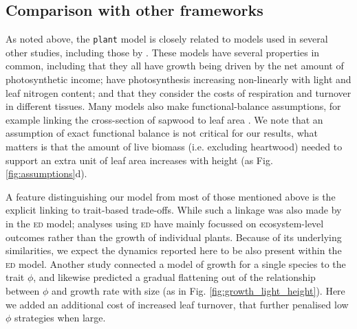 \documentclass[9pt,twocolumn,twoside,lineno]{pnas-new}
\newcommand{\plant}{\texttt{plant}}
\begin{document}
\subsection{Comparison with other frameworks}

As noted above, the {\plant} model is closely related to models used in several other studies, including those by \citep{Givnish-1988, Yokozawa-1995, Makela-1997, King-1999, King-2005, Moorcroft-2001, Li-2014}. These models have several properties in common, including that they all have growth being driven by the net amount of photosynthetic income; have photosynthesis increasing non-linearly with light and leaf nitrogen content; and that they consider the costs of respiration and turnover in different tissues. Many models also make functional-balance assumptions, for example linking the cross-section of sapwood to leaf area \citep{Givnish-1988, Yokozawa-1995, Makela-1997, King-2005, Moorcroft-2001}. We note that an assumption of exact functional balance is not critical for our results, what matters is that the amount of live biomass (i.e. excluding heartwood) needed to support an extra unit of leaf area increases with height (as Fig. \ref{fig:assumptions}d).

A feature distinguishing our model from most of those mentioned above is the explicit linking to trait-based trade-offs. While such a linkage was also made by \citep{Moorcroft-2001} in the \textsc{ed} model; analyses using \textsc{ed} have mainly focussed on ecosystem-level outcomes rather than the growth of individual plants. Because of its underlying similarities, we expect the dynamics reported here to be also present within the \textsc{ed} model. Another study \citep{King-1999} connected a model of growth for a single species to the trait $\phi$, and likewise predicted a gradual flattening out of the relationship between $\phi$ and growth rate with size (as in Fig. \ref{fig:growth_light_height}). Here we added an additional cost of increased leaf turnover, that further penalised low $\phi$ strategies when large.
\end{document}
